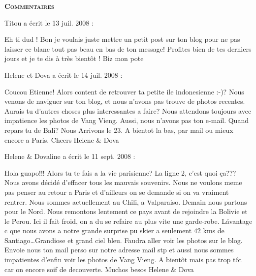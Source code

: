 \bigskip
\textbf{\textsc{Commentaires}}

\medskip
Titou a écrit le 13 juil. 2008 :
\begin{displayquote}
Eh ti dud !
Bon je voulais juste mettre un petit post sur ton blog pour ne pas laisser ce blanc tout pas beau en bas de ton message! Profites bien de tes derniers jours et je te dis à très bientôt !
Biz mon pote
\end{displayquote}

\medskip
Helene et Dova a écrit le 14 juil. 2008 :
\begin{displayquote}
Coucou Etienne!
Alors content de retrouver ta petite ile indonesienne :-)?
Nous venons de naviguer sur ton blog, et nous n'avons pas trouve de photos recentes. Aurais tu d'autres choses plus interessantes a faire?
Nous attendons toujours avec impatience les photos de Vang Vieng.
Aussi, nous n'avons pas ton e-mail.
Quand repars tu de Bali? Nous Arrivons le 23.
A bientot la bas, par mail ou mieux encore a Paris.
Cheers Helene \& Dova
\end{displayquote}

\medskip
Helene \& Dovaline a écrit le 11 sept. 2008 :
\begin{displayquote}
Hola guapo!!!
Alors tu te fais a la vie parisienne? La ligne 2, c'est quoi ça??? Nous avons décidé d'effacer tous les mauvais souvenirs. Nous ne voulons meme pas penser au retour a Paris et d'ailleurs on se demande si on va vraiment rentrer.
Nous sommes actuellement au Chili, a Valparaiso. Demain nous partons pour le Nord. Nous remontons lentement ce pays avant de rejoindre la Bolivie et le Perou. Ici il fait froid, on a du se refaire au plus vite une garde-robe. Lávantage c que nous avons a notre grande surprise pu skier a seulement 42 kms de Santiago\dots Grandiose et grand ciel bleu. Faudra aller voir les photos sur le blog.
Envoie nous ton mail perso sur notre adresse mail stp et aussi nous sommes impatientes d'enfin voir les photos de Vang Vieng.
A bientôt mais pas trop tôt car on encore soif de decouverte.
Muchos besos
Helene \& Dova
\end{displayquote}

\vfill
